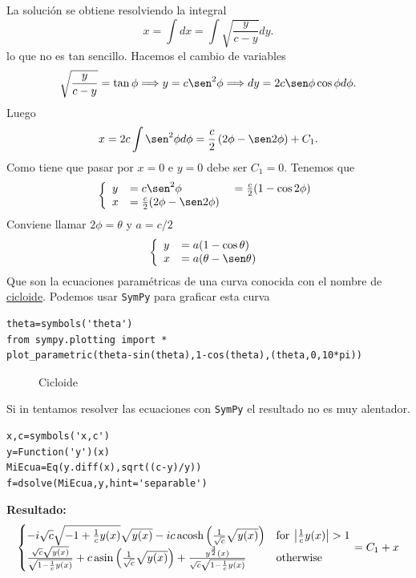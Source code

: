La solución se obtiene resolviendo la integral
\[x=\int dx=\int \sqrt{\frac{y}{c-y}}dy.\]
lo que no es tan sencillo. Hacemos el cambio de variables
\[\sqrt{\frac{y}{c-y}}=\tan\phi\Longrightarrow y=c\sen^2\phi\Longrightarrow dy=2c\sen\phi\cos\phi d\phi.\]
Luego
\[x=2c\int\sen^2\phi d\phi=\frac{c}{2}\left(2\phi-\sen 2\phi\right)+C_1.\]
Como tiene que pasar por $x=0$ e $y=0$ debe ser $C_1=0$.  Tenemos que
 \[\left\{\begin{array}{l l l}
	      y&=c\sen^2 \phi&=\frac{c}{2}(1-\cos2\phi)\\
	      x&=\frac{c}{2}(2\phi-\sen2\phi)\ &\\
          \end{array}\right.
\]
Conviene llamar $2\phi=\theta$ y $a=c/2$
 \[\left\{\begin{array}{l l }
	      y&= a(1-\cos\theta)\\
	      x&=a(\theta-\sen\theta)\
          \end{array}\right.
\]
Que son la ecuaciones paramétricas de una curva conocida con el nombre de \href{http://es.wikipedia.org/wiki/Cicloide}{cicloide}. Podemos usar \texttt{SymPy} para graficar esta curva
\begin{lstlisting}
theta=symbols('theta')
from sympy.plotting import *
plot_parametric(theta-sin(theta),1-cos(theta),(theta,0,10*pi))
\end{lstlisting}



\begin{figure}[h]
\begin{center}
\end{center}\caption{Cicloide}\label{fig:cicloide}
\end{figure}


Si in tentamos resolver las ecuaciones con \texttt{SymPy} el resultado no es muy alentador.

\begin{lstlisting}
x,c=symbols('x,c')
y=Function('y')(x)
MiEcua=Eq(y.diff(x),sqrt((c-y)/y))
f=dsolve(MiEcua,y,hint='separable')
\end{lstlisting}
\textbf{Resultado:}
\[
 \begin{cases} - i \sqrt{c} \sqrt{-1 + \frac{1}{c} y{\left (x \right )}} \sqrt{y{\left (x \right )}} - i c \operatorname{acosh}{\left (\frac{1}{\sqrt{c}} \sqrt{y{\left (x \right )}} \right )} & \text{for}\: \left\lvert{\frac{1}{c} y{\left (x \right )}}\right\rvert > 1 \\ \- \frac{\sqrt{c} \sqrt{y{\left (x \right )}}}{\sqrt{1 - \frac{1}{c} y{\left (x \right )}}} + c \operatorname{asin}{\left (\frac{1}{\sqrt{c}} \sqrt{y{\left (x \right )}} \right )} + \frac{y^{\frac{3}{2}}{\left (x \right )}}{\sqrt{c} \sqrt{1 - \frac{1}{c} y{\left (x \right )}}} & \text{otherwise} \end{cases} = C_{1} + x
\]




